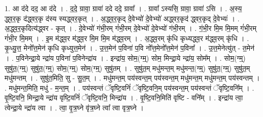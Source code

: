 \documentclass[17pt]{extarticle}
\begin{document}
1. आ द॑दे दद॒ आ द॑दे । . द॒दे॒ ग्रावा॒ ग्रावा॑ ददे ददे॒ ग्रावा᳚ । . ग्रावा᳚ ऽस्यसि॒ ग्रावा॒ ग्रावा॑ ऽसि । . अ॒स्य॒ द्ध्व॒र॒कृ द॑द्ध्वर॒कृ द॑स्य स्यद्ध्वर॒कृत् । . अ॒द्ध्व॒र॒कृद् दे॒वेभ्यो॑ दे॒वेभ्यो॑ अद्ध्वर॒कृद॑ द्ध्वर॒कृद् दे॒वेभ्यः॑ । . अ॒द्ध्व॒र॒कृदित्य॑द्ध्वर - कृत् । . दे॒वेभ्यो॑ गंभी॒रम् गं॑भी॒रम् दे॒वेभ्यो॑ दे॒वेभ्यो॑ गंभी॒रम् । . गं॒भी॒र मि॒म मि॒मम् गं॑भी॒रम् गं॑भी॒र मि॒मम् । . इ॒म म॑द्ध्व॒र म॑द्ध्व॒र मि॒म मि॒म म॑द्ध्व॒रम् । . अ॒द्ध्व॒रम् कृ॑धि कृध्यद्ध्व॒र म॑द्ध्व॒रम् कृ॑धि । . कृ॒ध्यु॒त्त॒ मेनो᳚त्त॒मेन॑ कृधि कृध्युत्त॒मेन॑ । . उ॒त्त॒मेन॑ प॒विना॑ प॒वि नो᳚त्त॒मेनो᳚त्त॒मेन॑ प॒विना᳚ । . उ॒त्त॒मेनेत्यु॑त् - त॒मेन॑ । . प॒विनेन्द्रा॒ये न्द्रा॑य प॒विना॑ प॒विनेन्द्रा॑य । . इन्द्रा॑य॒ सोम॒(ग्म्॒) सोम॒ मिन्द्रा॒ये न्द्रा॑य॒ सोम᳚म् । . सोम॒(ग्म्॒) सुषु॑त॒(ग्म्॒) सुषु॑त॒(ग्म्॒) सोम॒(ग्म्॒) सोम॒(ग्म्॒) सुषु॑तम् । . सुषु॑त॒म् मधु॑मन्त॒म् मधु॑मन्त॒(ग्म्॒) सुषु॑त॒(ग्म्॒) सुषु॑त॒म् मधु॑मन्तम् । . सुषु॑त॒मिति॒ सु - सु॒त॒म् । . मधु॑मन्त॒म् पय॑स्वन्त॒म् पय॑स्वन्त॒म् मधु॑मन्त॒म् मधु॑मन्त॒म् पय॑स्वन्तम् । . मधु॑मन्त॒मिति॒ मधु॑ - म॒न्त॒म् । . पय॑स्वन्तं ॅवृष्टि॒वनिं॑ ॅवृष्टि॒वनि॒म् पय॑स्वन्त॒म् पय॑स्वन्तं ॅवृष्टि॒वनि᳚म् । . वृ॒ष्टि॒वनि॒ मिन्द्रा॒ये न्द्रा॑य वृष्टि॒वनिं॑ ॅवृष्टि॒वनि॒ मिन्द्रा॑य । . वृ॒ष्टि॒वनि॒मिति॑ वृष्टि - वनि᳚म् । . इन्द्रा॑य त्वा॒ त्वेन्द्रा॒ये न्द्रा॑य त्वा । . त्वा॒ वृ॒त्र॒घ्ने वृ॑त्र॒घ्ने त्वा᳚ त्वा वृत्र॒घ्ने । \newline
\end{document}
